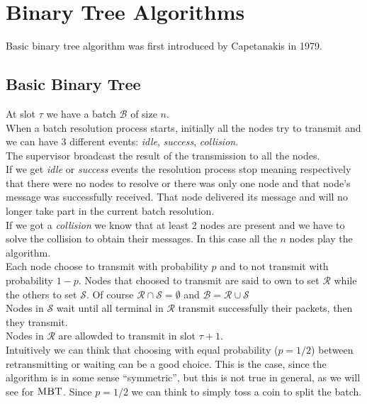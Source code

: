 \documentclass[12pt,a4paper]{report}
\newcommand{\algname}[1]{\ensuremath{\mbox{\sc #1}}}
\begin{document}
\section{Binary Tree Algorithms}
Basic binary tree algorithm was first introduced by Capetanakis  \cite{capetanakis} in 1979.
\subsection{Basic Binary Tree}
\label{basicbinarytreedescription}
At slot $\tau$ we have a batch $\mathcal{B}$ of size $n$.\\
When a batch resolution process starts, initially all the nodes try to transmit and we can have 3 different events: \emph{idle}, \emph{success}, \emph{collision}.	\\
The supervisor broadcast the result of the transmission to all the nodes.\\
If we get \emph{idle} or  \emph{success} events the resolution process stop meaning respectively that there were no nodes to resolve or there was only one node and that node's message was successfully received. That node delivered its message and will no longer take part in the current batch resolution.\\
If we got a \emph{collision} we know that at least 2 nodes are present and we have to solve the collision to obtain their messages. In this case all the $n$ nodes play the algorithm.\\
Each node choose to transmit with probability $p$ and to not transmit with probability $1-p$. Nodes that choosed to transmit  are said to own to set $\mathcal{R}$ while the others to set $\mathcal{S}$. Of course $\mathcal{R}  \cap \mathcal{S} = \emptyset$ and $\mathcal{B} = \mathcal{R}  \cup \mathcal{S}$\\
Nodes in $\mathcal{S}$ wait until all terminal in $\mathcal{R}$ transmit successfully their packets, then they transmit.\\
Nodes in $\mathcal{R}$ are allowded to transmit in slot $\tau +1$.\\


Intuitively we can think that choosing with equal probability ($p=1/2$) between retransmitting or waiting can be a good choice. This is the case, since the algorithm is in some sense ``symmetric'', but this is not true in general, as we will see for \algname{MBT}. Since $p=1/2$ we can think to simply toss a coin to split the batch.\\
\end{document}
